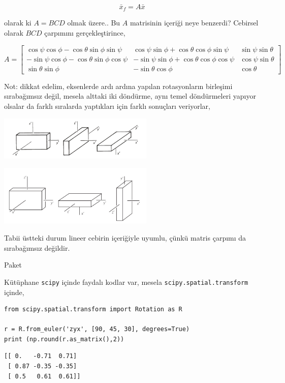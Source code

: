 \documentclass[12pt,fleqn]{article}\usepackage{../../common}
\begin{document}
$$
\bar{x}_f =  A \bar{x}
$$

olarak ki $A = BCD$ olmak üzere.. Bu $A$ matrisinin içeriği neye benzerdi? Cebirsel
olarak $BCD$ çarpımını gerçekleştirince,

$$
A = \left[\begin{array}{ccc}
\cos\psi\cos\phi-\cos\theta\sin\phi\sin\psi &
\cos\psi\sin\phi + \cos\theta\cos\phi\sin\psi &
\sin\psi\sin\theta \\
-\sin\psi\cos\phi-\cos\theta\sin\phi\cos\psi &
-\sin\psi\sin\phi + \cos\theta\cos\phi\cos\psi &
\cos\psi\sin\theta \\
\sin\theta \sin\phi &
-\sin\theta\cos\phi &
\cos\theta
\end{array}\right]
$$

Not: dikkat edelim, eksenlerde ardı ardına yapılan rotasyonların birleşimi
sırabağımsız değil, mesela alttaki iki döndürme, aynı temel döndürmeleri
yapıyor olsalar da farklı sıralarda yaptıkları için farklı sonuçları veriyorlar,

\includegraphics[width=20em]{phy_072_rot_01.png}

\includegraphics[width=20em]{phy_072_rot_02.png}

Tabii üstteki durum lineer cebirin içeriğiyle uyumlu, çünkü matris çarpımı da
sırabağımsız değildir.

Paket

Kütüphane \verb!scipy! içinde faydalı kodlar var, mesela \verb!scipy.spatial.transform!
içinde,

\begin{verbatim}
from scipy.spatial.transform import Rotation as R

r = R.from_euler('zyx', [90, 45, 30], degrees=True)
print (np.round(r.as_matrix(),2))
\end{verbatim}

\begin{verbatim}
[[ 0.   -0.71  0.71]
 [ 0.87 -0.35 -0.35]
 [ 0.5   0.61  0.61]]
\end{verbatim}
\end{document}
